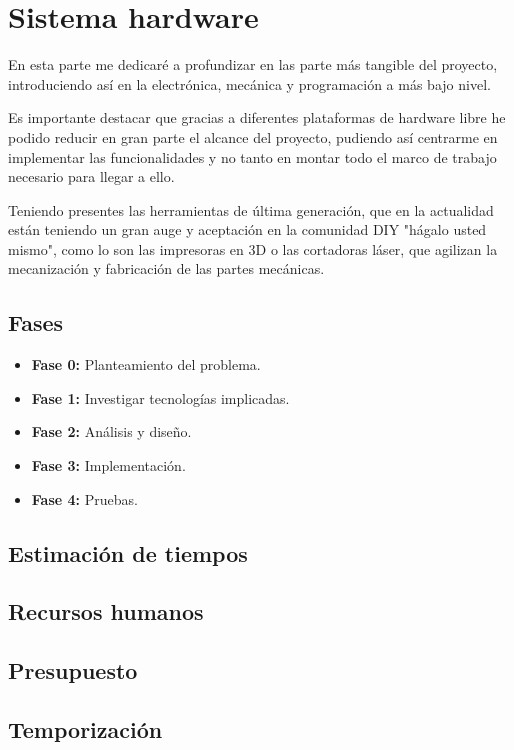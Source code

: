 \chapter{Sistema hardware}

\bigskip
En esta parte me dedicaré a profundizar en las parte más tangible del proyecto, introduciendo así en la electrónica, 
mecánica y programación a más bajo nivel.

\bigskip
Es importante destacar que gracias a diferentes plataformas de hardware libre he podido reducir en gran parte el alcance del proyecto, pudiendo así centrarme en implementar las funcionalidades y no tanto en montar todo el marco de trabajo 
necesario para llegar a ello. 

\bigskip
Teniendo presentes las  herramientas de última generación, que en la actualidad están teniendo un gran auge y aceptación 
en la comunidad DIY \cite{DIY} "hágalo usted mismo", como lo son las impresoras en 3D o las cortadoras láser, que agilizan la mecanización y fabricación de las partes mecánicas.

\section{Fases}

\begin{itemize}
	\item \textbf{Fase 0:} Planteamiento del problema.
	\item \textbf{Fase 1:} Investigar tecnologías implicadas.
	\item \textbf{Fase 2:} Análisis y diseño.
	\item \textbf{Fase 3:} Implementación.
	\item \textbf{Fase 4:} Pruebas.
\end{itemize}




\section{Estimación de tiempos}
\section{Recursos humanos}
\section{Presupuesto}
\section{Temporización}

